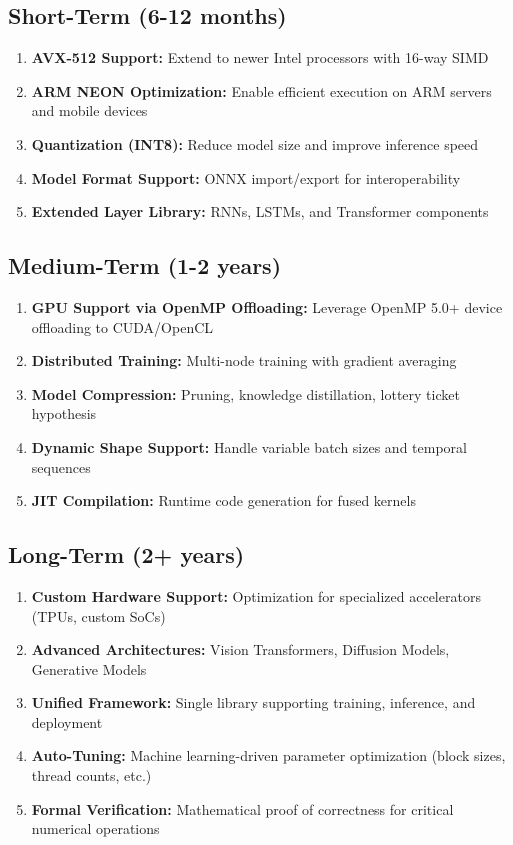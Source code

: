 \documentclass[12pt,oneside,a4paper]{report}
\begin{document}
\subsection{Short-Term (6-12 months)}

\begin{enumerate}
    \item \textbf{AVX-512 Support:} Extend to newer Intel processors with 16-way SIMD
    \item \textbf{ARM NEON Optimization:} Enable efficient execution on ARM servers and mobile devices
    \item \textbf{Quantization (INT8):} Reduce model size and improve inference speed
    \item \textbf{Model Format Support:} ONNX import/export for interoperability
    \item \textbf{Extended Layer Library:} RNNs, LSTMs, and Transformer components
\end{enumerate}

\subsection{Medium-Term (1-2 years)}

\begin{enumerate}
    \item \textbf{GPU Support via OpenMP Offloading:} Leverage OpenMP 5.0+ device offloading to CUDA/OpenCL
    \item \textbf{Distributed Training:} Multi-node training with gradient averaging
    \item \textbf{Model Compression:} Pruning, knowledge distillation, lottery ticket hypothesis
    \item \textbf{Dynamic Shape Support:} Handle variable batch sizes and temporal sequences
    \item \textbf{JIT Compilation:} Runtime code generation for fused kernels
\end{enumerate}

\subsection{Long-Term (2+ years)}

\begin{enumerate}
    \item \textbf{Custom Hardware Support:} Optimization for specialized accelerators (TPUs, custom SoCs)
    \item \textbf{Advanced Architectures:} Vision Transformers, Diffusion Models, Generative Models
    \item \textbf{Unified Framework:} Single library supporting training, inference, and deployment
    \item \textbf{Auto-Tuning:} Machine learning-driven parameter optimization (block sizes, thread counts, etc.)
    \item \textbf{Formal Verification:} Mathematical proof of correctness for critical numerical operations
\end{enumerate}
\end{document}

